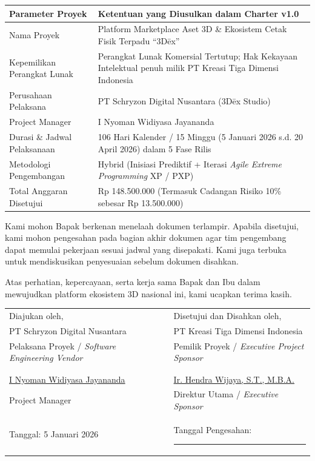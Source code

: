\documentclass[11pt,a4paper]{article}
\newcommand{\thdr}[1]{\centering\arraybackslash\textbf{#1}}
\begin{document}
\vspace*{2pt}
\noindent
\begin{tabularx}{\textwidth}{| L{4.8cm} | Y |}
\hline
{} \thdr{Parameter Proyek} & \thdr{Ketentuan yang Diusulkan dalam Charter v1.0} \\
\hline
Nama Proyek & Platform Marketplace Aset 3D \& Ekosistem Cetak Fisik Terpadu ``3D\={e}x'' \\
\hline
Kepemilikan Perangkat Lunak & Perangkat Lunak Komersial Tertutup; Hak Kekayaan Intelektual penuh milik PT Kreasi Tiga Dimensi Indonesia \\
\hline
Perusahaan Pelaksana & PT Schryzon Digital Nusantara (3D\={e}x Studio) \\
\hline
Project Manager & I Nyoman Widiyasa Jayananda \\
\hline
Durasi \& Jadwal Pelaksanaan & 106 Hari Kalender / 15 Minggu (5 Januari 2026 s.d. 20 April 2026) dalam 5 Fase Rilis \\
\hline
Metodologi Pengembangan & Hybrid (Inisiasi Prediktif + Iterasi \textit{Agile Extreme Programming} XP / PXP) \\
\hline
Total Anggaran Disetujui & Rp 148.500.000 (Termasuk Cadangan Risiko 10\% sebesar Rp 13.500.000) \\
\hline
\end{tabularx}
\vspace{6pt}

Kami mohon Bapak berkenan menelaah dokumen terlampir. Apabila disetujui, kami mohon pengesahan pada bagian akhir dokumen agar tim pengembang dapat memulai pekerjaan sesuai jadwal yang disepakati. Kami juga terbuka untuk mendiskusikan penyesuaian sebelum dokumen disahkan.

Atas perhatian, kepercayaan, serta kerja sama Bapak dan Ibu dalam mewujudkan platform ekosistem 3D nasional ini, kami ucapkan terima kasih.

\vspace{8pt}

\noindent
\begin{tabularx}{\textwidth}{@{} Y L{0.8cm} Y @{}}
Diajukan oleh, & & Disetujui dan Disahkan oleh, \\
PT Schryzon Digital Nusantara & & PT Kreasi Tiga Dimensi Indonesia \\
Pelaksana Proyek / \textit{Software Engineering Vendor} & & Pemilik Proyek / \textit{Executive Project Sponsor} \\
& & \\
& & \\
\underline{I Nyoman Widiyasa Jayananda} & & \underline{Ir. Hendra Wijaya, S.T., M.B.A.} \\
Project Manager & & Direktur Utama / \textit{Executive Sponsor} \\
Tanggal: 5 Januari 2026 & & Tanggal Pengesahan: \rule{3.2cm}{0.4pt} \\
\end{tabularx}
\end{document}
